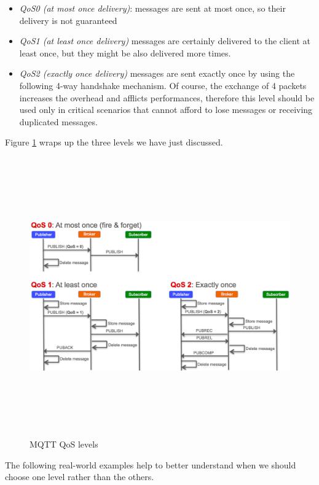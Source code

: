 \documentclass[12pt]{report}
\begin{document}
{\begin{itemize}
\setlength{\itemindent}{+4mm}
\item \emph{QoS0 (at most once delivery)}: messages are sent at most once, so their delivery is not guaranteed
\item \emph{QoS1 (at least once delivery)} messages are certainly delivered to the client at least once, but they might be also delivered more times.
\item \emph{QoS2 (exactly once delivery)} messages are sent exactly once by using the following 4-way handshake mechanism.
Of course, the exchange of 4 packets increases the overhead and afflicts performances, therefore this level should be used only in critical scenarios that cannot afford to lose messages or receiving duplicated messages.
\end{itemize}

Figure \ref{fig:qos_levels} wraps up the three levels we have just discussed.

\begin{figure}[H]
\includegraphics[width=12.5cm,height=12cm,keepaspectratio]{qos_levels}
\centering
\caption{MQTT QoS levels}
\label{fig:qos_levels}
\end{figure}

{\setlength{\parindent}{0cm} {The following real-world examples help to better understand when we should choose one level rather than the others.\\
}

}}
\end{document}
